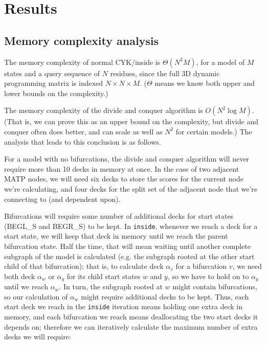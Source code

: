 \documentclass[11pt]{article}
\begin{document}

\section{Results}

\subsection{Memory complexity analysis}

The memory complexity of normal CYK/inside is $\Theta(N^2M)$, for a
model of $M$ states and a query sequence of $N$ residues, since the
full 3D dynamic programming matrix is indexed $N \times N \times
M$. ($\Theta$ means we know both upper and lower bounds on the
complexity.)

The memory complexity of the divide and conquer algorithm is $O(N^2
\log M)$. (That is, we can prove this as an upper bound on the
complexity, but divide and conquer often does better, and can scale as
well as $N^2$ for certain models.) The analysis that leads to this
conclusion is as follows.

For a model with no bifurcations, the divide and conquer algorithm
will never require more than 10 decks in memory at once. In the case
of two adjacent MATP nodes, we will need six decks to store the scores
for the current node we're calculating, and four decks for the split
set of the adjacent node that we're connecting to (and dependent
upon).

Bifurcations will require some number of additional decks for start
states (BEGL\_S and BEGR\_S) to be kept. In \texttt{inside}, whenever we
reach a deck for a start state, we will keep that deck in memory until
we reach the parent bifurcation state. Half the time, that will mean
waiting until another complete subgraph of the model is calculated
(e.g. the subgraph rooted at the other start child of that
bifurcation); that is, to calculate deck $\alpha_v$ for a bifurcation
$v$, we need both deck $\alpha_w$ or $\alpha_y$ for its child start
states $w$ and $y$, so we have to hold on to $\alpha_y$ until we reach
$\alpha_w$. In turn, the subgraph rooted at $w$ might contain
bifurcations, so our calculation of $\alpha_w$ might require
additional decks to be kept. Thus, each start deck we reach in the
\texttt{inside} iteration means holding one extra deck in memory, and
each bifurcation we reach means deallocating the two start decks it
depends on; therefore we can iteratively calculate the maximum number
of extra decks we will require:
\end{document}

